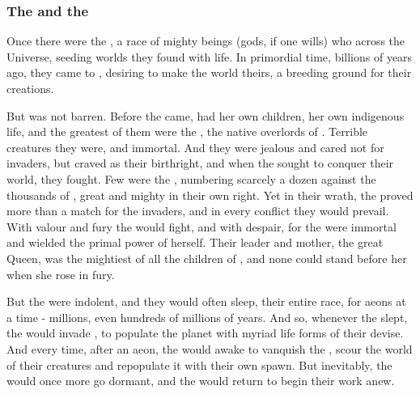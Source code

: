 \subsubsection{The \voyagers{} and the \krakens}
Once there were the \voyagers, a race of mighty beings (gods, if one wills) who \travelled across the Universe, seeding worlds they found with life. In primordial time, billions of years ago, they came to \Miith{}, desiring to make the world theirs, a breeding ground for their creations. 

But \Miith{} was not barren. Before the \voyagers{} came, \Miith{} had her own children, her own indigenous life, and the greatest of them were the \krakens, the native overlords of \Miith{}. Terrible creatures they were, and immortal. And they were jealous and cared not for invaders, but craved \Miith{} as their birthright, and when the \voyagers{} sought to conquer their world, they fought. Few were the \krakens{}, numbering scarcely a dozen against the thousands of \voyagers{}, great and mighty in their own right. Yet in their wrath, the \krakens{} proved more than a match for the invaders, and in every conflict they would prevail. With valour and fury the \voyagers{} would fight, and with despair, for the \krakens{} were immortal and wielded the primal power of \Miith{} herself. Their leader and mother, the great \Kraken{} Queen, was the mightiest of all the children of \Miith{}, and none could stand before her when she rose in fury. 

But the \krakens{} were indolent, and they would often sleep, their entire race, for aeons at a time - millions, even hundreds of millions of years. And so, whenever the \krakens{} slept, the \voyagers{} would invade \Miith{}, to populate the planet with myriad life forms of their devise. And every time, after an aeon, the \krakens{} would awake to vanquish the \voyagers{}, scour the world of their creatures and repopulate it with their own spawn. But inevitably, the \krakens{} would once more go dormant, and the \voyagers{} would return to begin their work anew. 

